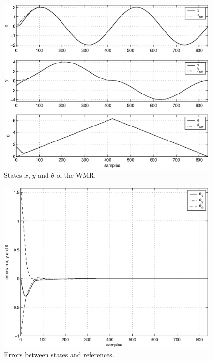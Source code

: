 \documentclass[twocolumn]{IEEEtran} %
\begin{document}
\begin{figure}\begin{center}
    \includegraphics[width=\linewidth]{Figures/states.eps}
    \caption{States $x$, $y$ and $\theta$ of the WMR.}
    \label{fig:states}
\end{center}\end{figure}
\begin{figure}\begin{center}
    \includegraphics[width=\linewidth]{Figures/errors.eps}
    \caption{Errors between states and references.}
    \label{fig:errors}
\end{center}\end{figure}
\end{document}
